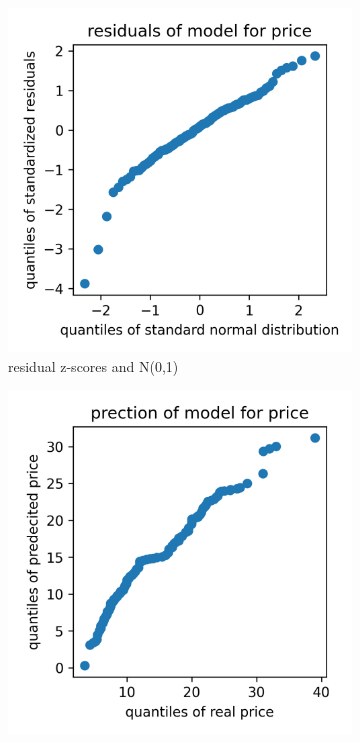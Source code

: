 \documentclass[12 pt]{scrartcl}
\begin{document}
\begin{figure}[htb]
  \centering

  \begin{subfigure}[b]{0.33\textwidth}
    \centering
    \includegraphics[width=\textwidth]{./images/qqplot_resz_price.png}
    \caption{residual z-scores and N(0,1)}
    \label{fig:qqplotreszprice}
  \end{subfigure}
  \begin{subfigure}[b]{0.33\textwidth}
    \centering
    \includegraphics[width=\textwidth]{./images/qqplot_yyhat_price.png}

\end{subfigure}
\end{figure}
\end{document}
